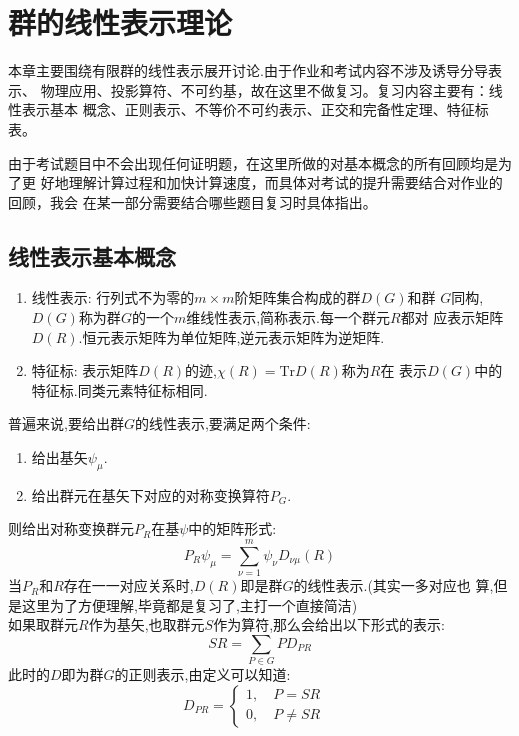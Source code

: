 \documentclass{ctexart}
\begin{document}
\section{群的线性表示理论}

本章主要围绕有限群的线性表示展开讨论.由于作业和考试内容不涉及诱导分导表示、
物理应用、投影算符、不可约基，故在这里不做复习。复习内容主要有：线性表示基本
概念、正则表示、不等价不可约表示、正交和完备性定理、特征标表。

由于考试题目中不会出现任何证明题，在这里所做的对基本概念的所有回顾均是为了更
好地理解计算过程和加快计算速度，而具体对考试的提升需要结合对作业的回顾，我会
在某一部分需要结合哪些题目复习时具体指出。

\subsection{线性表示基本概念}

\begin{enumerate}
    \item 线性表示: 行列式不为零的$m\times m$阶矩阵集合构成的群$D(G)$和群
    $G$同构,$D(G)$称为群$G$的一个$m$维线性表示,简称表示.每一个群元$R$都对
    应表示矩阵$D(R)$.恒元表示矩阵为单位矩阵,逆元表示矩阵为逆矩阵.
    \item 特征标: 表示矩阵$D(R)$的迹,$\chi(R)=\mathrm{Tr}D(R)$称为$R$在
    表示$D(G)$中的特征标.同类元素特征标相同.
\end{enumerate}

普遍来说,要给出群$G$的线性表示,要满足两个条件:
\begin{enumerate}
    \item 给出基矢$\psi_{\mu}$.
    \item 给出群元在基矢下对应的对称变换算符$P_{G}$.
\end{enumerate}
\noindent 则给出对称变换群元$P_{R}$在基$\psi$中的矩阵形式:
\begin{equation}
    P_{R}\psi_{\mu}=\sum_{\nu=1}^{m}\psi_{\nu}D_{\nu\mu}(R)
\end{equation}
当$P_{R}$和$R$存在一一对应关系时,$D(R)$即是群$G$的线性表示.(其实一多对应也
算,但是这里为了方便理解,毕竟都是复习了,主打一个直接简洁)\\

\noindent 如果取群元$R$作为基矢,也取群元$S$作为算符,那么会给出以下形式的表示:
\begin{equation}
    SR=\sum_{P\in G}PD_{PR}
\end{equation}
此时的$D$即为群$G$的正则表示,由定义可以知道:
\[
D_{PR}=\begin{cases}
1,\quad P=SR & \\
0,\quad P\neq SR &
\end{cases}
\]
\end{document}
